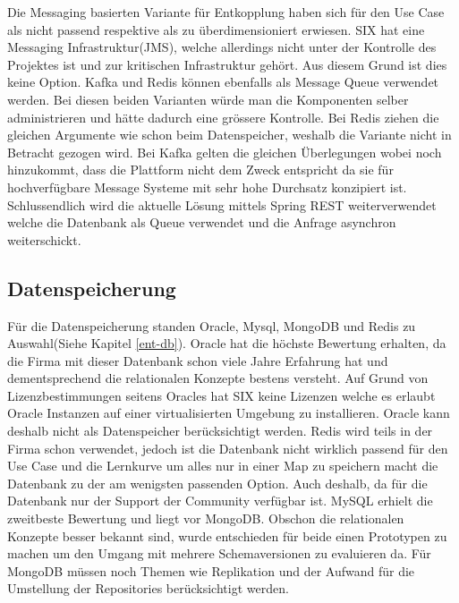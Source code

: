 Die Messaging basierten Variante für Entkopplung haben sich für den Use Case als nicht passend respektive als zu überdimensioniert erwiesen. SIX hat eine Messaging Infrastruktur(JMS), welche allerdings nicht unter der Kontrolle des Projektes ist und zur kritischen Infrastruktur gehört. Aus diesem Grund ist dies keine Option. Kafka und Redis können ebenfalls als Message Queue verwendet werden. Bei diesen beiden Varianten würde man die Komponenten selber administrieren und hätte dadurch eine grössere Kontrolle. Bei Redis ziehen die gleichen Argumente wie schon beim Datenspeicher, weshalb die Variante nicht in Betracht gezogen wird. Bei Kafka gelten die gleichen Überlegungen wobei noch hinzukommt, dass die Plattform nicht dem Zweck entspricht da sie für hochverfügbare Message Systeme mit sehr hohe Durchsatz konzipiert ist.\newline
Schlussendlich wird die aktuelle Lösung mittels Spring REST weiterverwendet welche die Datenbank als Queue verwendet und die Anfrage asynchron weiterschickt. 

\subsection{Datenspeicherung}

Für die Datenspeicherung standen Oracle, Mysql, MongoDB und Redis zu Auswahl(Siehe Kapitel \ref{ent-db}). \newline
Oracle hat die höchste Bewertung erhalten, da die Firma mit dieser Datenbank schon viele Jahre Erfahrung hat und dementsprechend die relationalen Konzepte bestens versteht. Auf Grund von Lizenzbestimmungen seitens Oracles hat SIX keine Lizenzen welche es erlaubt Oracle Instanzen auf einer virtualisierten Umgebung zu installieren. Oracle kann deshalb nicht als Datenspeicher berücksichtigt werden.\newline
Redis wird teils in der Firma schon verwendet, jedoch ist die Datenbank nicht wirklich passend für den Use Case und die Lernkurve um alles nur in einer Map zu speichern macht die Datenbank zu der am wenigsten passenden Option. Auch deshalb, da für die Datenbank nur der Support der Community verfügbar ist.\newline
MySQL erhielt die zweitbeste Bewertung und liegt vor MongoDB. Obschon die relationalen Konzepte besser bekannt sind, wurde entschieden für beide einen Prototypen zu machen um den Umgang mit mehrere Schemaversionen zu evaluieren da. Für MongoDB müssen noch Themen wie Replikation und der Aufwand für die Umstellung der Repositories berücksichtigt werden.

